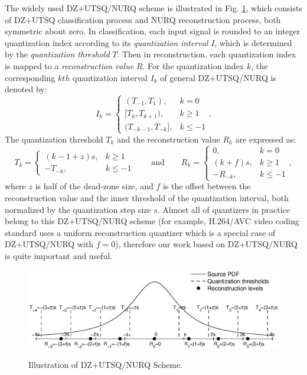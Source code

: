 \documentclass[smallabstract,smallcaptions]{dccpaper}
\begin{document}
The widely used DZ+UTSQ/NURQ scheme \cite{Sullivan_VCIP2005} is illustrated in Fig. \ref{fig:DZ+UTSQ_NURQ}, which consists of DZ+UTSQ classification process and NURQ reconstruction process, both symmetric about zero. In classification, each input signal is rounded to an integer quantization index according to its \emph{quantization interval} $I$, which is determined by the \emph{quantization threshold} $T$. Then in reconstruction, each quantization index is mapped to a \emph{reconstruction value} $R$. For the quantization index $k$, the corresponding $kth$ quantization interval $I_{k}$ of general DZ+UTSQ/NURQ is denoted by:
\begin{equation}
\label{equ:interval}
I_{k}=\left\{ \begin{array}{ll}
(T_{-1}, T_{1}),         & k = 0 \\
{[T_{k}, T_{k+1})},        & k \ge 1 \\
(T_{-k-1}, T_{-k}],      & k \le -1
\end{array}\right. .
\end{equation}
The quantization threshold $T_{k}$ and the reconstruction value $R_{k}$ are expressed as:
\begin{equation}
\label{equ:DZ+UTSQ/NURQ}
T_{k}=\left\{ \begin{array}{ll}
(k-1+z)s, & k \ge 1 \\
-T_{-k},  & k \le -1
\end{array}\right.
\qquad \textrm{and} \qquad
R_{k}=\left\{ \begin{array}{ll}
0,        & k = 0 \\
(k+f)s,   & k \ge 1 \\
-R_{-k},  & k \le -1
\end{array}\right. ,
\end{equation}
where $z$ is half of the dead-zone size, and $f$ is the offset between the reconstruction value and the inner threshold of the quantization interval, both normalized by the quantization step size $s$. Almost all of quantizers in practice belong to this DZ+UTSQ/NURQ scheme (for example, H.264/AVC video coding standard uses a uniform reconstruction quantizer which is a special case of DZ+UTSQ/NURQ with $f=0$), therefore our work based on DZ+UTSQ/NURQ is quite important and useful.

\begin{figure}[tp]
\centering
\includegraphics[width = 1.0\linewidth]{Figures/section2/DZ+UTSQ_NURQ}\\
\caption{\label{fig:DZ+UTSQ_NURQ}%
Illustration of DZ+UTSQ/NURQ Scheme.}
\vspace{5pt}
\end{figure}
\end{document}
